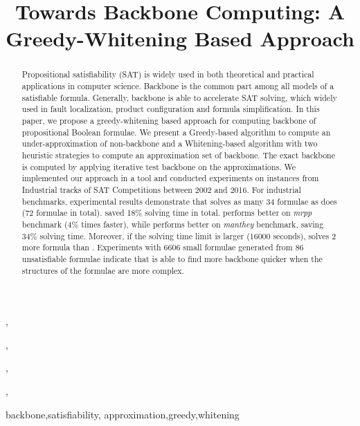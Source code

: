 \documentclass{IOS-Book-Article}
\def\hb{\hbox to 10.7 cm{}}
\begin{document}
\pagestyle{headings}
\def\thepage{}

\begin{frontmatter}              %


\title{Towards Backbone Computing: A Greedy-Whitening Based Approach}

\markboth{}{January 2017\hb}

\author[A]{ 
},
\author[A]{ }
,
\author[A]{ }
,
\author[B]{ }
,
\author[A]{ }

\address[A]{National Research Center of Trustworthy Embedded Software
        \\ East China Normal University, China}
\address[B]{School of Information Science and Technology ShanghaiTech University, China}

\begin{abstract}
Propositional satisfiability (SAT) is widely used in both theoretical and practical applications in computer science. Backbone is the common part among all models of a satisfiable formula.
Generally, backbone is able to accelerate SAT solving, which widely used in fault localization, product configuration and formula simplification.
In this paper, we propose a greedy-whitening based approach for computing backbone of propositional Boolean formulae.
We present a Greedy-based algorithm to compute an under-approximation of non-backbone and
a Whitening-based algorithm with two heuristic strategies to compute an approximation set of backbone.
The exact backbone is computed by applying iterative test backbone on the approximations.
We implemented our approach in a tool \tool and conducted experiments on instances from Industrial tracks of SAT Competitions
between 2002 and 2016. For industrial benchmarks, experimental results demonstrate that \tool solves as many 34 formulae as \minibones does (72 formulae in total). \tool saved 18\% solving time in total.
\minibones performs better on \textit{mrpp} benchmark (4\% times faster), while \tool performs better on \textit{manthey} benchmark, saving 34\% solving time.
Moreover, if the solving time limit is larger (16000 seconds), \tool solves 2 more formula than \minibones.
Experiments with 6606 small formulae generated from 86 unsatisfiable formulae indicate that \tool is able to find more backbone quicker when the structures of the formulae are more complex.
\end{abstract}

\begin{keyword}
backbone\sep satisfiability\sep
approximation\sep greedy\sep whitening
\end{keyword}
\end{frontmatter}
\markboth{January 2017\hb}{January 2017\hb}
\end{document}
